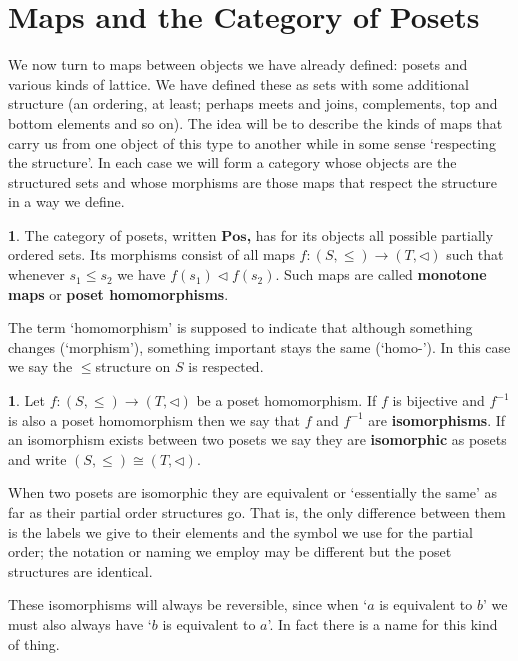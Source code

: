 \documentclass[oneside,english]{amsbook}
\numberwithin{section}{chapter}
\theoremstyle{plain}
\theoremstyle{definition}
\newtheorem{defn}[thm]{\protect\definitionname}
\providecommand{\definitionname}{Definition}
\begin{document}
\section{Maps and the Category of Posets}

We now turn to maps between objects we have already defined: posets and various kinds of lattice. We have defined these as sets with some additional structure (an ordering, at least; perhaps meets and joins, complements, top and bottom elements and so on). The idea will be to describe the kinds of maps that carry us from one object of this type to another while in some sense `respecting the structure'. In each case we will form a category whose objects are the structured sets and whose morphisms are those maps that respect the structure in a way we define. 

\begin{defn} 
	The category of posets, written \textbf{$\mathbf{Pos}$, }has for its objects all possible partially ordered sets. Its morphisms consist of all maps $f:(S,\le)\to(T,\lhd)$ such that whenever $s_{1}\le s_{2}$ we have $f(s_{1})\lhd f(s_{2})$. Such maps are called \textbf{monotone maps }or \textbf{poset homomorphisms}. 
\end{defn} 

The term `homomorphism' is supposed to indicate that although something changes (`morphism'), something important stays the same (`homo-'). In this case we say the $\le$structure on $S$ is respected. 

\begin{defn} 
	Let $f:(S,\le)\to(T,\lhd)$ be a poset homomorphism. If $f$ is bijective and $f^{-1}$ is also a poset homomorphism then we say that $f$ and $f^{-1}$ are \textbf{isomorphisms}. If an isomorphism exists between two posets we say they are \textbf{isomorphic} as posets and write $(S,\le)\cong(T,\lhd)$. 
\end{defn} 

When two posets are isomorphic they are equivalent or `essentially the same' as far as their partial order structures go. That is, the only difference between them is the labels we give to their elements and the symbol we use for the partial order; the notation or naming we employ may be different but the poset structures are identical.

These isomorphisms will always be reversible, since when `$a$ is equivalent to $b$' we must also always have `$b$ is equivalent to $a$'. In fact there is a name for this kind of thing. 
\end{document}
